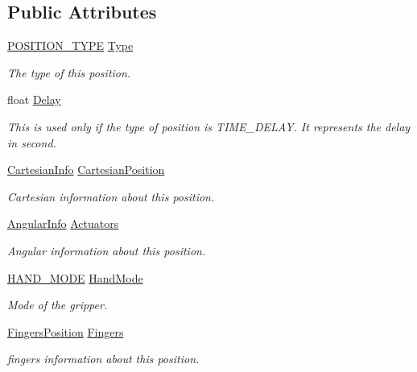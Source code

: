\subsection*{Public Attributes}
\begin{DoxyCompactItemize}
\item 
\hyperlink{_kinova_types_8h_a0a1c22d235ef1b13cfcd1419d10babc9}{P\+O\+S\+I\+T\+I\+O\+N\+\_\+\+T\+Y\+PE} \hyperlink{struct_user_position_a93c748d4ee51239fcbcd487d88e52ffa}{Type}
\begin{DoxyCompactList}\small\item\em The type of this position. \end{DoxyCompactList}\item 
float \hyperlink{struct_user_position_aa18896c1238a50c8ad81c66dfd76ac5e}{Delay}
\begin{DoxyCompactList}\small\item\em This is used only if the type of position is T\+I\+M\+E\+\_\+\+D\+E\+L\+AY. It represents the delay in second. \end{DoxyCompactList}\item 
\hyperlink{struct_cartesian_info}{Cartesian\+Info} \hyperlink{struct_user_position_ab363c40971853637f728978e604c438f}{Cartesian\+Position}
\begin{DoxyCompactList}\small\item\em Cartesian information about this position. \end{DoxyCompactList}\item 
\hyperlink{struct_angular_info}{Angular\+Info} \hyperlink{struct_user_position_ab0c5b71622c1e0d3033572578e947cf3}{Actuators}
\begin{DoxyCompactList}\small\item\em Angular information about this position. \end{DoxyCompactList}\item 
\hyperlink{_kinova_types_8h_ad7050e4cfb6e844e9be962fba8eeb817}{H\+A\+N\+D\+\_\+\+M\+O\+DE} \hyperlink{struct_user_position_a83779902810d0e5e16d533e0f964c0df}{Hand\+Mode}
\begin{DoxyCompactList}\small\item\em Mode of the gripper. \end{DoxyCompactList}\item 
\hyperlink{struct_fingers_position}{Fingers\+Position} \hyperlink{struct_user_position_a727907bb6a98b0f3d10aaa8011b67927}{Fingers}
\begin{DoxyCompactList}\small\item\em fingers information about this position. \end{DoxyCompactList}\end{DoxyCompactItemize}


